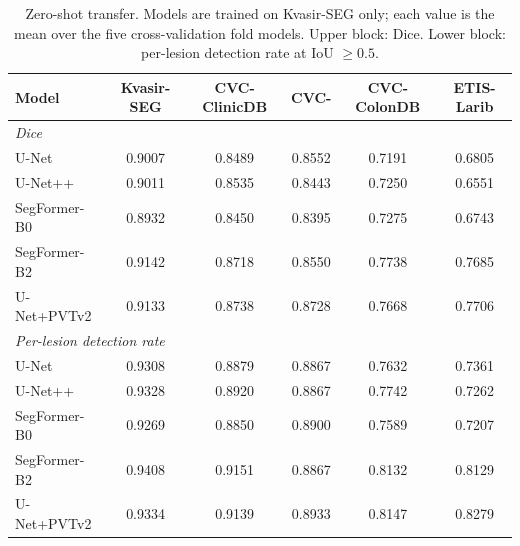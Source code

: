 \begin{table}[t]
\centering
\footnotesize
\caption{Zero-shot transfer. Models are trained on Kvasir-SEG only; each value is the mean over the five cross-validation fold models. Upper block: Dice. Lower block: per-lesion detection rate at IoU $\geq 0.5$.}
\label{tab:cross}
\begin{tabular}{lccccc}
\toprule
Model & Kvasir-\allowbreak SEG & CVC-\allowbreak ClinicDB & CVC-\allowbreak 300 & CVC-\allowbreak ColonDB & ETIS-\allowbreak Larib \\
\midrule
\multicolumn{6}{l}{\emph{Dice}}\\
\quad U-Net & 0.9007 & 0.8489 & 0.8552 & 0.7191 & 0.6805 \\
\quad U-Net++ & 0.9011 & 0.8535 & 0.8443 & 0.7250 & 0.6551 \\
\quad SegFormer-B0 & 0.8932 & 0.8450 & 0.8395 & 0.7275 & 0.6743 \\
\quad SegFormer-B2 & 0.9142 & 0.8718 & 0.8550 & 0.7738 & 0.7685 \\
\quad U-Net+PVTv2 & 0.9133 & 0.8738 & 0.8728 & 0.7668 & 0.7706 \\
\midrule
\multicolumn{6}{l}{\emph{Per-lesion detection rate}}\\
\quad U-Net & 0.9308 & 0.8879 & 0.8867 & 0.7632 & 0.7361 \\
\quad U-Net++ & 0.9328 & 0.8920 & 0.8867 & 0.7742 & 0.7262 \\
\quad SegFormer-B0 & 0.9269 & 0.8850 & 0.8900 & 0.7589 & 0.7207 \\
\quad SegFormer-B2 & 0.9408 & 0.9151 & 0.8867 & 0.8132 & 0.8129 \\
\quad U-Net+PVTv2 & 0.9334 & 0.9139 & 0.8933 & 0.8147 & 0.8279 \\
\bottomrule
\end{tabular}
\end{table}
